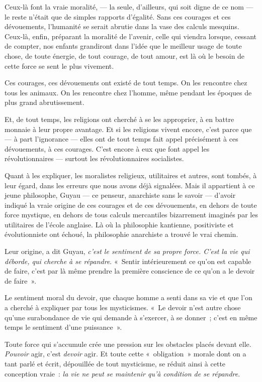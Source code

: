 \documentclass[french,twoside]{book} %
\begin{document}
Ceux-là font la vraie moralité, — la seule, d’ailleurs, qui soit digne de ce nom — le reste n’était que de simples rapports d’égalité. Sans ces courages et ces dévouements, l’humanité se serait abrutie dans la vase des calculs mesquins. Ceux-là, enfin, préparant la moralité de l’avenir, celle qui viendra lorsque, cessant de compter, nos enfants grandiront dans l’idée que le meilleur usage de toute chose, de toute énergie, de tout courage, de tout amour, est là où le besoin de cette force se sent le plus vivement.\par
\bigbreak
\noindent Ces courages, ces dévouements ont existé de tout temps. On les rencontre chez tous les animaux. On les rencontre chez l’homme, même pendant les époques de plus grand abrutissement.\par
Et, de tout temps, les religions ont cherché à se les approprier, à en battre monnaie à leur propre avantage. Et si les religions vivent encore, c’est parce que — à part l’ignorance — elles ont de tout temps fait appel précisément à ces dévouements, à ces courages. C’est encore à eux que font appel les révolutionnaires — surtout les révolutionnaires socialistes.\par
Quant à les expliquer, les moralistes religieux, utilitaires et autres, sont tombés, à leur égard, dans les erreurs que nous avons déjà signalées. Mais il appartient à ce jeune philosophe, Guyau — ce penseur, anarchiste sans le savoir — d’avoir indiqué la vraie origine de ces courages et de ces dévouements, en dehors de toute force mystique, en dehors de tous calculs mercantiles bizarrement imaginés par les utilitaires de l’école anglaise. Là où la philosophie kantienne, positiviste et évolutionniste ont échoué, la philosophie anarchiste a trouvé le vrai chemin.\par
Leur origine, a dit Guyau, \emph{c’est le sentiment de sa propre force. C’est la vie qui déborde, qui cherche à se répandre}. « Sentir intérieurement ce qu’on est capable de faire, c’est par là même prendre la première conscience de ce qu’on a le devoir de faire ».\par
Le sentiment moral du devoir, que chaque homme a senti dans sa vie et que l’on a cherché à expliquer par tous les mysticismes. « Le devoir n’est autre chose qu’une surabondance de vie qui demande à s’exercer, à se donner ; c’est en même temps le sentiment d’une puissance ».\par
Toute force qui s’accumule crée une pression sur les obstacles placés devant elle. \emph{Pouvoir} agir, c’est \emph{devoir} agir. Et toute cette « obligation » morale dont on a tant parlé et écrit, dépouillée de tout mysticisme, se réduit ainsi à cette conception vraie : \emph{la vie ne peut se maintenir qu’à condition de se répandre}.\par
\end{document}
